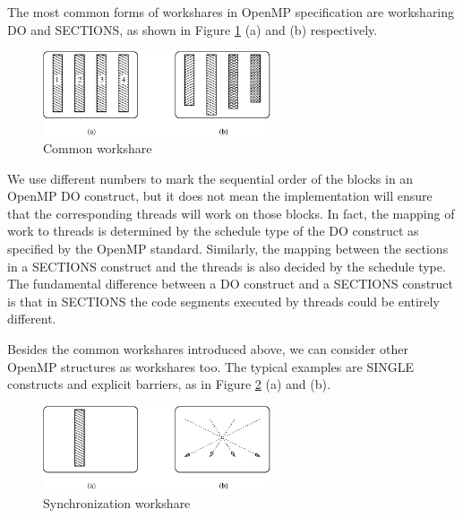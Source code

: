 The most common forms of workshares in OpenMP specification are
worksharing DO and SECTIONS, as shown in Figure \ref{fig:workshare} (a)
and (b) respectively.

\begin{figure}[!h]
  \begin{center}
    \includegraphics[angle=0, width=0.6\textwidth]{workshare.eps}
    \caption{\footnotesize Common workshare}
    \label{fig:workshare}
  \end{center}
\end{figure}

We use different numbers to mark the sequential order of the blocks in
an OpenMP DO construct, but it does not mean the implementation will
ensure that the corresponding threads will work on those blocks. In
fact, the mapping of work to threads is determined by the schedule
type of the DO construct as specified by the OpenMP standard. Similarly,
the mapping between the sections in a SECTIONS construct and the
threads is also decided by the schedule type.  The fundamental
difference between a DO construct and a SECTIONS construct is that in
SECTIONS the code segments executed by threads could be entirely
different.

Besides the common workshares introduced above, we can consider
other OpenMP structures as workshares too. The typical examples are
SINGLE constructs and explicit barriers, as in Figure
\ref{fig:synchronization} (a) and (b).

\begin{figure}[!h]
  \begin{center}
    \includegraphics[angle=0, width=0.6\textwidth]{synchronization.eps}
    \caption{\footnotesize Synchronization workshare}
    \label{fig:synchronization}
  \end{center}
\end{figure}

